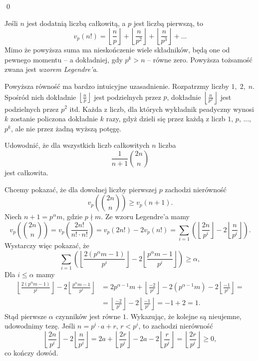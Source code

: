\qed


\noindent
Jeśli $n$ jest dodatnią liczbą całkowitą, a $p$ jest liczbą pierwszą, to
\[
	v_p(n!) = \left\lfloor \frac{n}{p} \right\rfloor + \left\lfloor \frac{n}{p^2} \right\rfloor + \left\lfloor \frac{n}{p^3} \right\rfloor + ...
\]
Mimo że powyższa suma ma nieskończenie wiele składników, będą one od pewnego momentu -- a dokładniej, gdy $p^k > n$ -- równe zero. Powyższa tożsamość zwana jest \textit{wzorem Legendre'a}.

\vspace{10px}

\noindent
Powyższa równość ma bardzo intuicyjne uzasadnienie. Rozpatrzmy liczby $1, \; 2, \; n$. Spośród nich dokładnie $\left\lfloor \frac{n}{p} \right\rfloor$ jest podzielnych przez $p$, dokładnie $\left\lfloor \frac{n}{p^2} \right\rfloor$ jest podzielnych przez $p^2$ itd. Każda z liczb, dla których wykładnik peadyczny wynosi $k$ zostanie policzona dokładnie $k$ razy, gdyż dzieli się przez każdą z liczb $1$, $p$, ..., $p^k$, ale nie przez żadną wyższą potęgę.

\vspace{10px}


\noindent
Udowodnić, że dla wszystkich liczb całkowitych $n$ liczba 
\[
	\frac{1}{n+1}{{2n}\choose{n}}
\]
jest całkowita.

\vspace{5px}


\noindent
Chcemy pokazać, że dla dowolnej liczby pierwszej $p$ zachodzi nierówność
\[
	v_p\left({2n}\choose{n} \right) \geqslant v_p(n + 1).
\]
Niech $n + 1 = p^{\alpha}m$, gdzie $p \nmid m$.
Ze wzoru Legendre'a mamy
\[
	v_p\left({2n}\choose{n} \right) = v_p\left(\frac{2n!}{n! \cdot n!} \right) = v_p\left(2n! \right) - 2v_p\left(n! \right) =  \sum_{i = 1} \left(\left\lfloor \frac{2n}{p^i} \right\rfloor - 2\left\lfloor \frac{n}{p^i} \right\rfloor \right).
\]
Wystarczy więc pokazać, że
\[
	\sum_{i = 1} \left(\left\lfloor \frac{2(p^{\alpha}m - 1)}{p^i} \right\rfloor - 2\left\lfloor \frac{p^{\alpha}m - 1}{p^i} \right\rfloor \right) \geqslant \alpha,
\]
Dla $i \leqslant \alpha$ mamy
\begin{align*}
	\left\lfloor \frac{2(p^{\alpha}m - 1)}{p^i} \right\rfloor - 2\left\lfloor \frac{p^{\alpha}m - 1}{p^i} \right\rfloor &= 2p^{\alpha - 1}m + \left\lfloor \frac{-2}{p^i} \right\rfloor - 2\left(p^{\alpha - 1}m \right) -2\left\lfloor \frac{- 1}{p^i} \right\rfloor = \\
	&= \left\lfloor \frac{-2}{p^i} \right\rfloor - 2\left\lfloor \frac{- 1}{p^i} \right\rfloor = -1 + 2 = 1.
\end{align*}
Stąd pierwsze $\alpha$ czynników jest równe $1$. Wykazując, że kolejne są nieujemne, udowodnimy tezę. Jeśli $n = p^i\cdot a + r$, $r < p^i$, to zachodzi nierówność
\[
	\left\lfloor \frac{2n}{p^i} \right\rfloor - 2\left\lfloor \frac{n}{p^i} \right\rfloor = 2a + \left\lfloor  \frac{2r}{p^i} \right\rfloor - 2a - 2\left\lfloor \frac{r}{p^i} \right\rfloor = \left\lfloor  \frac{2r}{p^i} \right\rfloor \geqslant 0,
\]
co kończy dowód.
